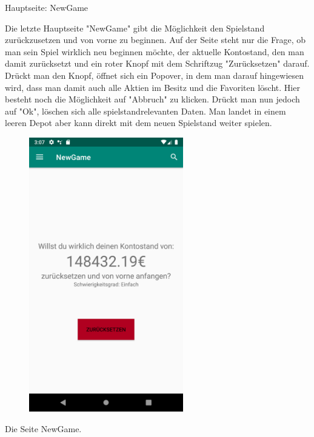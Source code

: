 \documentclass[10pt]{scrartcl}
\begin{document}

Hauptseite: NewGame

Die letzte Hauptseite "NewGame" gibt die Möglichkeit den Spielstand zurückzusetzen und von vorne zu beginnen. 
Auf der Seite steht nur die Frage, ob man sein Spiel wirklich neu beginnen möchte, der aktuelle Kontostand, den man damit zurücksetzt und ein roter Knopf mit dem Schriftzug "Zurücksetzen" darauf. Drückt man den Knopf, öffnet sich ein Popover, in dem man darauf hingewiesen wird, dass man damit auch alle Aktien im Besitz und die Favoriten löscht. Hier besteht noch die Möglichkeit auf "Abbruch" zu klicken. Drückt man nun jedoch auf "Ok", löschen sich alle spielstandrelevanten Daten. Man landet in einem leeren Depot aber kann direkt mit dem neuen Spielstand weiter spielen.

\begin{figure}[H]
	\centering
	\includegraphics[width=0.6\textwidth]{Bilder/Applikation/NewGame.png}
\end{figure}
Die Seite NewGame.
\end{document}
